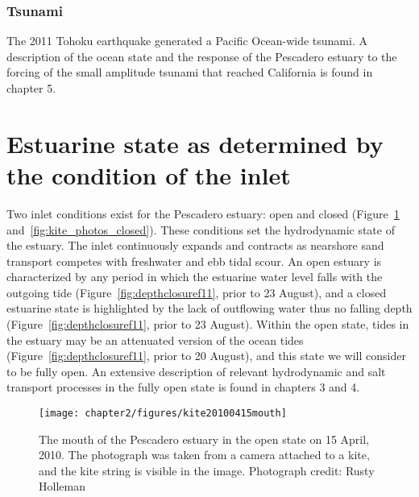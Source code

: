 \subsubsection{Tsunami}
The 2011 Tohoku earthquake generated a Pacific Ocean-wide tsunami. A description of the ocean state and the response of the Pescadero estuary to the forcing of the small amplitude tsunami that reached California is found in chapter 5.



\section{Estuarine state as determined by the condition of the inlet}
\label{betterlabelmaybe}

Two inlet conditions exist for the Pescadero estuary: open and closed (Figure~\ref{fig:kite_photos_open} and~\ref{fig:kite_photos_closed}).  These conditions set the hydrodynamic state of the estuary. The inlet continuously expands and contracts as nearshore sand transport competes with freshwater and ebb tidal scour. An open estuary is characterized by any period in which the estuarine water level falls with the outgoing tide (Figure~\ref{fig:depthclosuref11}, prior to 23 August), and a closed estuarine state is highlighted by the lack of outflowing water thus no falling depth (Figure~\ref{fig:depthclosuref11}, prior to 23 August). Within the open state, tides in the estuary may be an attenuated version of the ocean tides (Figure~\ref{fig:depthclosuref11}, prior to 20 August), and this state we will consider to be fully open. An extensive description of relevant hydrodynamic and salt transport processes in the fully open state is found in chapters 3 and 4.

\begin{figure}[h!]
	\begin{center}
		\texttt{[image: chapter2/figures/kite20100415mouth]} 
	\end{center}
\caption{The mouth of the Pescadero estuary in the open state on 15 April, 2010. The photograph was taken from a camera attached to a kite, and the kite string is visible in the image. Photograph credit: Rusty Holleman}\label{fig:kite_photos_open} \end{figure}

